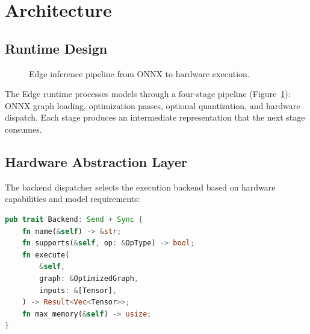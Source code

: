\documentclass[11pt,twocolumn]{article}
\begin{document}
\section{Architecture}

\subsection{Runtime Design}

\begin{figure}[t]
\centering
{}
\caption{Edge inference pipeline from ONNX to hardware execution.}
\label{fig:edge}
\end{figure}

The Edge runtime processes models through a four-stage pipeline (Figure~\ref{fig:edge}): ONNX graph loading, optimization passes, optional quantization, and hardware dispatch. Each stage produces an intermediate representation that the next stage consumes.

\subsection{Hardware Abstraction Layer}

The backend dispatcher selects the execution backend based on hardware capabilities and model requirements:

\begin{lstlisting}[language=Rust]
pub trait Backend: Send + Sync {
    fn name(&self) -> &str;
    fn supports(&self, op: &OpType) -> bool;
    fn execute(
        &self,
        graph: &OptimizedGraph,
        inputs: &[Tensor],
    ) -> Result<Vec<Tensor>>;
    fn max_memory(&self) -> usize;
}
\end{lstlisting}
\end{document}
